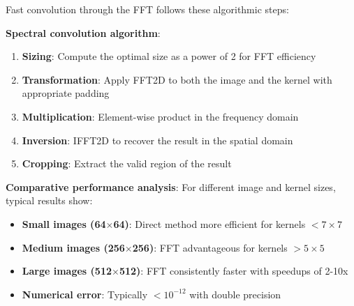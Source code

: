 \begin{example}\label{ex:fast_convolution_implementation}
Fast convolution through the \gls{FFT} follows these algorithmic steps:

\textbf{Spectral convolution algorithm}:
\begin{enumerate}
    \item \textbf{Sizing}: Compute the optimal size as a power of 2 for \gls{FFT} efficiency
    \item \textbf{Transformation}: Apply FFT2D to both the image and the kernel with appropriate padding
    \item \textbf{Multiplication}: Element-wise product in the frequency domain
    \item \textbf{Inversion}: IFFT2D to recover the result in the spatial domain
    \item \textbf{Cropping}: Extract the valid region of the result
\end{enumerate}

\textbf{Comparative performance analysis}:
For different image and kernel sizes, typical results show:
\begin{itemize}
    \item \textbf{Small images (64$\times$64)}: Direct method more efficient for kernels $< 7 \times 7$
    \item \textbf{Medium images (256$\times$256)}: \gls{FFT} advantageous for kernels $> 5 \times 5$
    \item \textbf{Large images (512$\times$512)}: \gls{FFT} consistently faster with speedups of 2-10x
    \item \textbf{Numerical error}: Typically $< 10^{-12}$ with double precision
\end{itemize}
\end{example}

